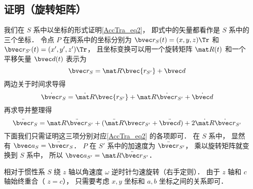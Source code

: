 \subsection{证明（旋转矩阵）}
我们在 $S$ 系中以坐标的形式证明\autoref{AccTra_eq2}， 即式中的矢量都看作是 $S$ 系中的三个坐标． 令点 $P$ 在两系中的坐标分别为 $\bvec r_S(t) = (x, y, z)\Tr$ 和 $\bvec r_{S'}(t) = (x', y', z')\Tr$， 且坐标变换可以用一个旋转矩阵 $\mat R(t)$ 和一个平移矢量 $\bvec d(t)$ 表示为
\begin{equation}
\bvec r_S = \mat R \bvec{r_{S'}} + \bvec d
\end{equation}
两边关于时间求导得
\begin{equation}
\dot{\bvec r}_S = \dot{\mat R} \bvec{r_{S'}} + \mat R \dot{\bvec r}_{S'}+ \dot{\bvec d}
\end{equation}
再求导并整理得
\begin{equation}
\ddot{\bvec r}_S = \mat R \ddot{\bvec r}_{S'} + (\ddot{\mat R} \bvec r_{S'} + \ddot{\bvec d}) + 2 \dot{\mat R} \dot{\bvec r}_{S'}
\end{equation}
下面我们只需证明这三项分别对应\autoref{AccTra_eq2} 的各项即可． 在 $S$ 系中， 显然有 $\bvec a_S = \ddot{\bvec r}_S$． $P$ 在 $S'$ 系中的加速度为 $\ddot{\bvec r}_{S'}$， 乘以旋转矩阵就变换到 $S$ 系中， 所以 $\bvec a_{S'} = \mat R \ddot{\bvec r}_{S'}$．

相对于惯性系 $S$ 绕 $z$ 轴以角速度 $\omega$ 逆时针匀速旋转（右手定则）． 由于 $z$ 轴和 $c$ 轴始终重合（ $z=c$）， 只需要考虑 $x,y$ 坐标和 $a,b$ 坐标之间的关系即可．

